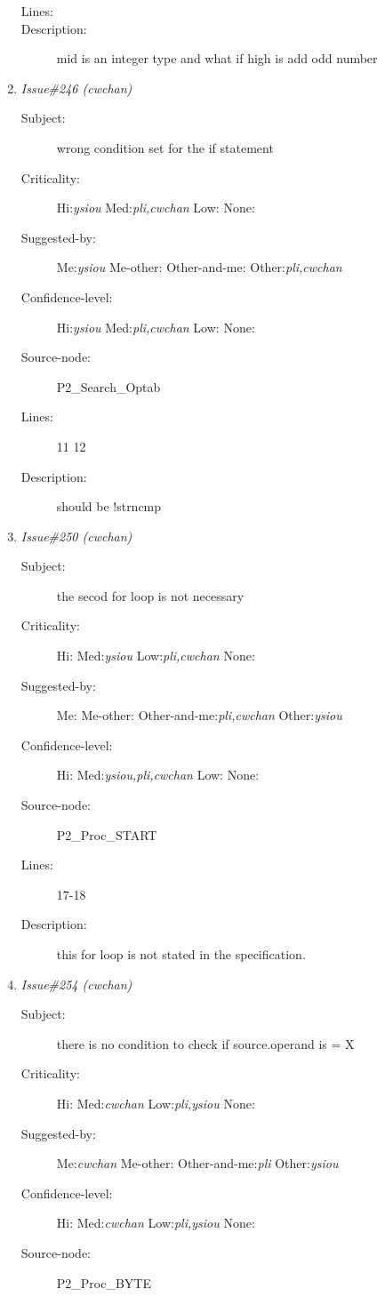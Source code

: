 \begin{enumerate}
\begin{description}
\item [Lines:] 

\item [Description:] mid is an integer type and what if high is add
odd number
\end{description}
\item {\it Issue\#246 (cwchan)}
\begin{description}
\item [Subject:] wrong condition set for the if statement
\item [Criticality:] Hi:{\it ysiou} Med:{\it pli,cwchan} Low:{\it } None:{\it }
\item [Suggested-by:] Me:{\it ysiou} Me-other:{\it } Other-and-me:{\it } Other:{\it pli,cwchan}
\item [Confidence-level:] Hi:{\it ysiou} Med:{\it pli,cwchan} Low:{\it } None:{\it }
\item [Source-node:] P2\_Search\_Optab

\item [Lines:] 11 12

\item [Description:] should be !strncmp
\end{description}
\item {\it Issue\#250 (cwchan)}
\begin{description}
\item [Subject:] the secod for loop is not necessary
\item [Criticality:] Hi:{\it } Med:{\it ysiou} Low:{\it pli,cwchan} None:{\it }
\item [Suggested-by:] Me:{\it } Me-other:{\it } Other-and-me:{\it pli,cwchan} Other:{\it ysiou}
\item [Confidence-level:] Hi:{\it } Med:{\it ysiou,pli,cwchan} Low:{\it } None:{\it }
\item [Source-node:] P2\_Proc\_START

\item [Lines:] 17-18

\item [Description:] this for loop is not stated in the specification.
\end{description}
\item {\it Issue\#254 (cwchan)}
\begin{description}
\item [Subject:] there is no condition to check if source.operand
is = X
\item [Criticality:] Hi:{\it } Med:{\it cwchan} Low:{\it pli,ysiou} None:{\it }
\item [Suggested-by:] Me:{\it cwchan} Me-other:{\it } Other-and-me:{\it pli} Other:{\it ysiou}
\item [Confidence-level:] Hi:{\it } Med:{\it cwchan} Low:{\it pli,ysiou} None:{\it }
\item [Source-node:] P2\_Proc\_BYTE


\end{description}
\end{enumerate}
